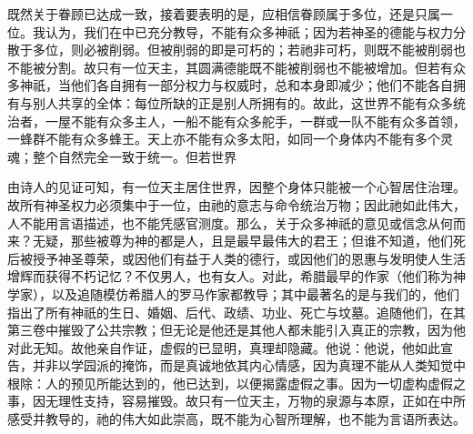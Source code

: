 既然关于眷顾已达成一致，接着要表明的是，应相信眷顾属于多位，还是只属一位。我认为，我们在中已充分教导，不能有众多神祇；因为若神圣的德能与权力分散于多位，则必被削弱。但被削弱的即是可朽的；若祂非可朽，则既不能被削弱也不能被分割。故只有一位天主，其圆满德能既不能被削弱也不能被增加。但若有众多神祇，当他们各自拥有一部分权力与权威时，总和本身即减少；他们不能各自拥有与别人共享的全体：每位所缺的正是别人所拥有的。故此，这世界不能有众多统治者，一屋不能有众多主人，一船不能有众多舵手，一群或一队不能有众多首领，一蜂群不能有众多蜂王。天上亦不能有众多太阳，如同一个身体内不能有多个灵魂；整个自然完全一致于统一。但若世界\par

\par

由诗人的见证可知，有一位天主居住世界，因整个身体只能被一个心智居住治理。故所有神圣权力必须集中于一位，由祂的意志与命令统治万物；因此祂如此伟大，人不能用言语描述，也不能凭感官测度。那么，关于众多神祇的意见或信念从何而来？无疑，那些被尊为神的都是人，且是最早最伟大的君王；但谁不知道，他们死后被授予神圣尊荣，或因他们有益于人类的德行，或因他们的恩惠与发明使人生活增辉而获得不朽记忆？不仅男人，也有女人。对此，希腊最早的作家（他们称为神学家），以及追随模仿希腊人的罗马作家都教导；其中最著名的是与我们的，他们指出了所有神祇的生日、婚姻、后代、政绩、功业、死亡与坟墓。追随他们，在其第三卷中摧毁了公共宗教；但无论是他还是其他人都未能引入真正的宗教，因为他对此无知。故他亲自作证，虚假的已显明，真理却隐藏。他说：他说，他如此宣告，并非以学园派的掩饰，而是真诚地依其内心情感，因为真理不能从人类知觉中根除：人的预见所能达到的，他已达到，以便揭露虚假之事。因为一切虚构虚假之事，因无理性支持，容易摧毁。故只有一位天主，万物的泉源与本原，正如在中所感受并教导的，祂的伟大如此崇高，既不能为心智所理解，也不能为言语所表达。\par

